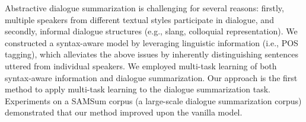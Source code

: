 Abstractive dialogue summarization is challenging for several reasons: firstly, multiple speakers from different textual styles participate in dialogue, and secondly, informal dialogue structures (e.g., slang, colloquial representation). We constructed a syntax-aware model by leveraging linguistic information (i.e., POS tagging), which alleviates the above issues by inherently distinguishing sentences uttered from individual speakers. We employed multi-task learning of both syntax-aware information and dialogue summarization. Our approach is the first method to apply multi-task learning to the dialogue summarization task. Experiments on a SAMSum corpus (a large-scale dialogue summarization corpus) demonstrated that our method improved upon the vanilla model.
